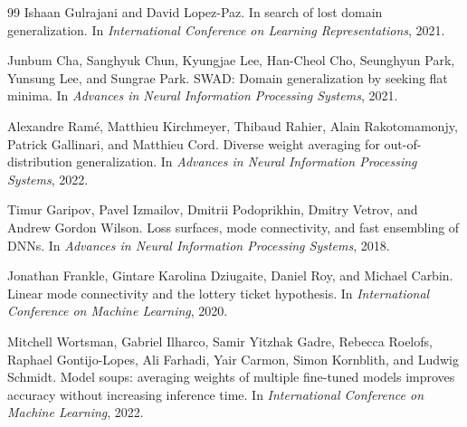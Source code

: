 \documentclass[11pt]{article}
\newcommand{\1}{\mathbf{1}}
\theoremstyle{plain}
\theoremstyle{definition}
\theoremstyle{remark}
\begin{document}
\begin{thebibliography}{99}
Ishaan Gulrajani and David Lopez-Paz.
\newblock In search of lost domain generalization.
\newblock In \emph{International Conference on Learning Representations}, 2021.

Junbum Cha, Sanghyuk Chun, Kyungjae Lee, Han-Cheol Cho, Seunghyun Park, Yunsung Lee, and Sungrae Park.
\newblock SWAD: Domain generalization by seeking flat minima.
\newblock In \emph{Advances in Neural Information Processing Systems}, 2021.

Alexandre Ram\'e, Matthieu Kirchmeyer, Thibaud Rahier, Alain Rakotomamonjy, Patrick Gallinari, and Matthieu Cord.
\newblock Diverse weight averaging for out-of-distribution generalization.
\newblock In \emph{Advances in Neural Information Processing Systems}, 2022.

Timur Garipov, Pavel Izmailov, Dmitrii Podoprikhin, Dmitry Vetrov, and Andrew Gordon Wilson.
\newblock Loss surfaces, mode connectivity, and fast ensembling of DNNs.
\newblock In \emph{Advances in Neural Information Processing Systems}, 2018.

Jonathan Frankle, Gintare Karolina Dziugaite, Daniel Roy, and Michael Carbin.
\newblock Linear mode connectivity and the lottery ticket hypothesis.
\newblock In \emph{International Conference on Machine Learning}, 2020.

Mitchell Wortsman, Gabriel Ilharco, Samir Yitzhak Gadre, Rebecca Roelofs, Raphael Gontijo-Lopes, Ali Farhadi, Yair Carmon, Simon Kornblith, and Ludwig Schmidt.
\newblock Model soups: averaging weights of multiple fine-tuned models improves accuracy without increasing inference time.
\newblock In \emph{International Conference on Machine Learning}, 2022.
\end{thebibliography}
\end{document}
